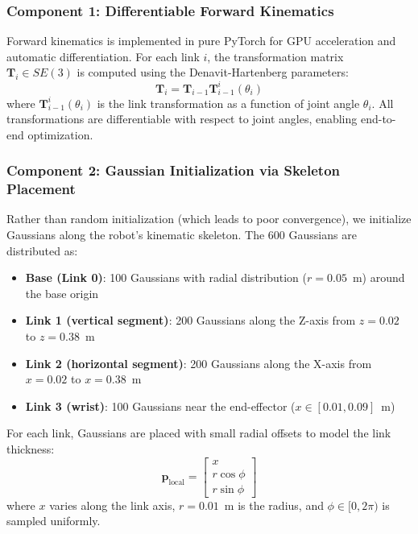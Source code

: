 \documentclass[12pt,a4paper,oneside]{report}
\begin{document}
\subsubsection{Component 1: Differentiable Forward Kinematics}
Forward kinematics is implemented in pure PyTorch for GPU acceleration and automatic differentiation. For each link $i$, the transformation matrix $\mathbf{T}_i \in SE(3)$ is computed using the Denavit-Hartenberg parameters:
\begin{equation}
\mathbf{T}_i = \mathbf{T}_{i-1} \mathbf{T}_{i-1}^{i}(\theta_i)
\label{eq:dh_transform_chain}
\end{equation}
where $\mathbf{T}_{i-1}^{i}(\theta_i)$ is the link transformation as a function of joint angle $\theta_i$. All transformations are differentiable with respect to joint angles, enabling end-to-end optimization.

\subsubsection{Component 2: Gaussian Initialization via Skeleton Placement}
Rather than random initialization (which leads to poor convergence), we initialize Gaussians along the robot's kinematic skeleton. The 600 Gaussians are distributed as:
\begin{itemize}
    \item \textbf{Base (Link 0)}: 100 Gaussians with radial distribution ($r = 0.05$~m) around the base origin
    \item \textbf{Link 1 (vertical segment)}: 200 Gaussians along the Z-axis from $z=0.02$ to $z=0.38$~m
    \item \textbf{Link 2 (horizontal segment)}: 200 Gaussians along the X-axis from $x=0.02$ to $x=0.38$~m
    \item \textbf{Link 3 (wrist)}: 100 Gaussians near the end-effector ($x \in [0.01, 0.09]$~m)
\end{itemize}

For each link, Gaussians are placed with small radial offsets to model the link thickness:
\begin{equation}
\mathbf{p}_{\text{local}} = \begin{bmatrix} x \\ r \cos\phi \\ r \sin\phi \end{bmatrix}
\end{equation}
where $x$ varies along the link axis, $r = 0.01$~m is the radius, and $\phi \in [0, 2\pi)$ is sampled uniformly.
\end{document}
